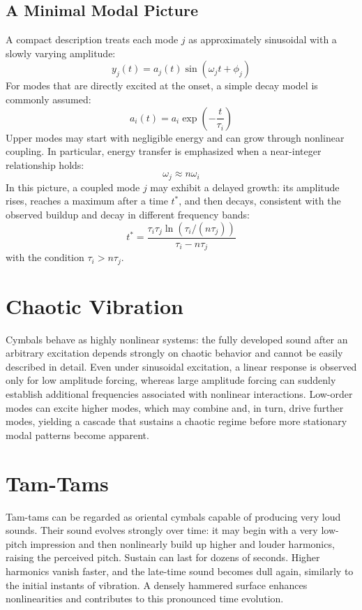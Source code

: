 \subsection{A Minimal Modal Picture}

A compact description treats each mode \(j\) as approximately sinusoidal with a slowly varying amplitude:
\[
y_j(t) = a_j(t) \sin(\omega_j t + \phi_j)
\]
For modes that are directly excited at the onset, a simple decay model is commonly assumed:
\[
a_i(t) = a_i \exp\left( - \frac{t}{\tau_i} \right)
\]
Upper modes may start with negligible energy and can grow through nonlinear coupling. In particular, energy transfer is emphasized when a near-integer relationship holds:
\[
\omega_j \approx n \omega_i
\]
In this picture, a coupled mode \(j\) may exhibit a delayed growth: its amplitude rises, reaches a maximum after a time \(t^\ast\), and then decays, consistent with the observed buildup and decay in different frequency bands:
\[
t^\ast = \frac{\tau_i \tau_j \ln\left( \tau_i / (n \tau_j) \right)}{\tau_i - n \tau_j}
\]
with the condition \( \tau_i > n \tau_j \). 

\section{Chaotic Vibration}

Cymbals behave as highly nonlinear systems: the fully developed sound after an arbitrary excitation depends strongly on chaotic behavior and cannot be easily described in detail. Even under sinusoidal excitation, a linear response is observed only for low amplitude forcing, whereas large amplitude forcing can suddenly establish additional frequencies associated with nonlinear interactions. Low-order modes can excite higher modes, which may combine and, in turn, drive further modes, yielding a cascade that sustains a chaotic regime before more stationary modal patterns become apparent.

\section{Tam-Tams}

Tam-tams can be regarded as oriental cymbals capable of producing very loud sounds. Their sound evolves strongly over time: it may begin with a very low-pitch impression and then nonlinearly build up higher and louder harmonics, raising the perceived pitch. Sustain can last for dozens of seconds. Higher harmonics vanish faster, and the late-time sound becomes dull again, similarly to the initial instants of vibration. A densely hammered surface enhances nonlinearities and contributes to this pronounced time evolution.

